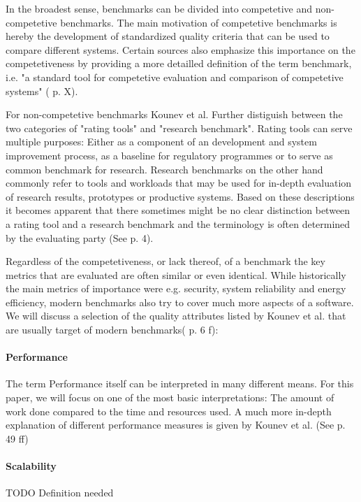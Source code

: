 \documentclass[	runningheads,
				a4paper]{llncs}
\begin{document}
In the broadest sense, benchmarks can be divided into competetive and non-competetive benchmarks. The main motivation of competetive benchmarks is hereby the development of standardized quality criteria that can be used to compare different systems. Certain sources also emphasize this importance on the competetiveness by providing a more detailled definition of the term benchmark, i.e. "a standard tool for competetive evaluation and comparison of competetive systems" (\cite{kistowski2015} p. X).

For non-competetive benchmarks Kounev et al. Further distiguish between the two categories of "rating tools" and "research benchmark". Rating tools can serve multiple purposes: Either as a component of an development and system improvement process, as a baseline for regulatory programmes or to serve as common benchmark for research. Research benchmarks on the other hand commonly refer to tools and workloads that may be used for in-depth evaluation of research results, prototypes or productive systems. Based on these descriptions it becomes apparent that there sometimes might be no clear distinction between a rating tool and a research benchmark and the terminology is often determined by the evaluating party (See \cite{Kounev} p. 4).

Regardless of the competetiveness, or lack thereof, of a benchmark the key metrics that are evaluated are often similar or even identical. While historically the main metrics of importance were e.g. security, system reliability and energy efficiency, modern benchmarks also try to cover much more aspects of a software. We will discuss a selection of the quality attributes listed by Kounev et al. that are usually target of modern benchmarks(\cite{Kounev} p. 6 f):

\paragraph{Performance} The term Performance itself can be interpreted in many different means. For this paper, we will focus on one of the most basic interpretations: The amount of work done compared to the time and resources used. A much more in-depth explanation of different performance measures is given by Kounev et al. (See \cite{Kounev} p. 49 ff)

\paragraph{Scalability} TODO Definition needed
\end{document}
